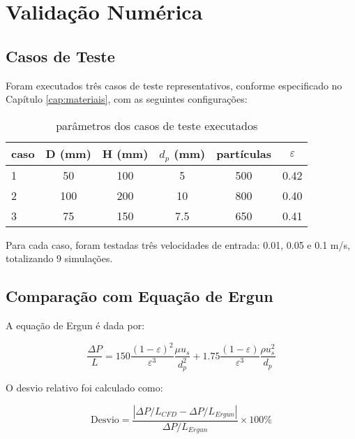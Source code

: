 \section{Validação Numérica}

\subsection{Casos de Teste}

Foram executados três casos de teste representativos, conforme especificado no Capítulo \ref{cap:materiais}, com as seguintes configurações:

\begin{table}[htb]
\centering
\caption{parâmetros dos casos de teste executados}
\label{tab:casos_teste}
\begin{tabular}{lccccc}
\toprule
\textbf{caso} & \textbf{D (mm)} & \textbf{H (mm)} & \textbf{$d_p$ (mm)} & \textbf{partículas} & \textbf{$\varepsilon$} \\
\midrule
1 & 50 & 100 & 5 & 500 & 0.42 \\
2 & 100 & 200 & 10 & 800 & 0.40 \\
3 & 75 & 150 & 7.5 & 650 & 0.41 \\
\bottomrule
\end{tabular}
\end{table}

Para cada caso, foram testadas três velocidades de entrada: 0.01, 0.05 e 0.1 m/s, totalizando 9 simulações.

\subsection{Comparação com Equação de Ergun}

A equação de Ergun \cite{ergun1952} é dada por:

\begin{equation}
\frac{\Delta P}{L} = 150 \frac{(1-\varepsilon)^2}{\varepsilon^3} \frac{\mu u_s}{d_p^2} + 1.75 \frac{(1-\varepsilon)}{\varepsilon^3} \frac{\rho u_s^2}{d_p}
\label{eq:ergun_validacao}
\end{equation}

O desvio relativo foi calculado como:

\begin{equation}
\text{Desvio} = \frac{|\Delta P/L_{CFD} - \Delta P/L_{Ergun}|}{\Delta P/L_{Ergun}} \times 100\%
\label{eq:desvio_validacao}
\end{equation}

